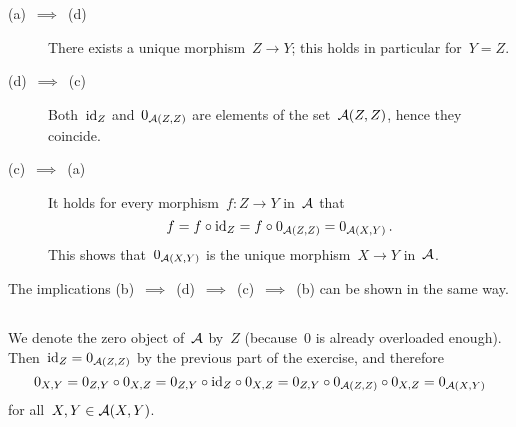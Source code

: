\section{}





\subsection{}

\begin{description}
  \item[(a)~$\implies$~(d)]
    There exists a unique morphism~$Z \to Y$;
    this holds in particular for~$Y = Z$.
  \item[(d)~$\implies$~(c)]
    Both~$\operatorname{id}_Z$ and~$0_{\mathcal{A}(Z,Z)}$ are elements of the  set~$\mathcal{A}(Z,Z)$, hence they coincide.
  \item[(c)~$\implies$~(a)]
    It holds for every morphism~$f \colon Z \to Y$ in~$\mathcal{A}$ that
    \[
        f
      = f \circ {\operatorname{id}_Z}
      = f \circ 0_{\mathcal{A}(Z,Z)}
      = 0_{\mathcal{A}(X,Y)} \,.
    \]
    This shows that~$0_{\mathcal{A}(X,Y)}$ is the unique morphism~$X \to Y$ in~$\mathcal{A}$.
\end{description}
The implications (b)~$\implies$~(d)~$\implies$~(c)~$\implies$~(b) can be shown in the same way.





\subsection{}

We denote the zero object of~$\mathcal{A}$ by~$Z$ (because~$0$ is already overloaded enough).
Then~$\operatorname{id}_Z = 0_{\mathcal{A}(Z,Z)}$ by the previous part of the exercise, and therefore
\[
    0_{X,Y}
  = 0_{Z,Y} \circ 0_{X,Z}
  = 0_{Z,Y} \circ {\operatorname{id}_Z} \circ 0_{X,Z}
  = 0_{Z,Y} \circ 0_{\mathcal{A}(Z,Z)} \circ 0_{X,Z}
  = 0_{\mathcal{A}(X,Y)}
\]
for all~$X, Y \in \mathcal{A}(X,Y)$.




